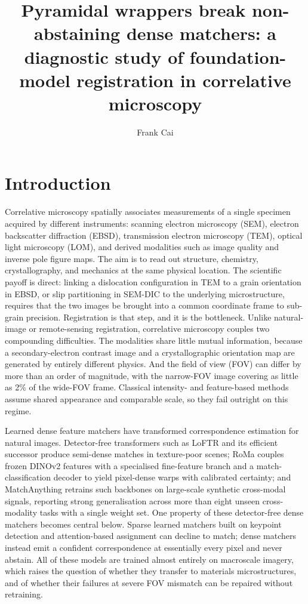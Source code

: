 \documentclass[fleqn,10pt]{wlscirep}
\title{Pyramidal wrappers break non-abstaining dense matchers: a diagnostic study of foundation-model registration in correlative microscopy}
\author[1,*]{Frank Cai}
\affil[1]{Purdue University, West Lafayette, IN, USA; ORCID: 0009-0003-0041-1459}
\affil[*]{frankyc11223@gmail.com}
\begin{document}
\flushbottom
\maketitle
\thispagestyle{empty}

\section*{Introduction}

Correlative microscopy spatially associates measurements of a single specimen acquired by different instruments: scanning electron microscopy (SEM), electron backscatter diffraction (EBSD), transmission electron microscopy (TEM), optical light microscopy (LOM), and derived modalities such as image quality and inverse pole figure maps. The aim is to read out structure, chemistry, crystallography, and mechanics at the same physical location\cite{durmaz2026foundation}. The scientific payoff is direct: linking a dislocation configuration in TEM to a grain orientation in EBSD, or slip partitioning in SEM-DIC to the underlying microstructure, requires that the two images be brought into a common coordinate frame to sub-grain precision. Registration is that step, and it is the bottleneck. Unlike natural-image or remote-sensing registration, correlative microscopy couples two compounding difficulties. The modalities share little mutual information, because a secondary-electron contrast image and a crystallographic orientation map are generated by entirely different physics. And the field of view (FOV) can differ by more than an order of magnitude, with the narrow-FOV image covering as little as 2\% of the wide-FOV frame. Classical intensity- and feature-based methods assume shared appearance and comparable scale, so they fail outright on this regime\cite{durmaz2026amalgamatch}.

Learned dense feature matchers have transformed correspondence estimation for natural images. Detector-free transformers such as LoFTR\cite{sun2021loftr} and its efficient successor\cite{wang2024efficientloftr} produce semi-dense matches in texture-poor scenes; RoMa\cite{edstedt2024roma} couples frozen DINOv2 features\cite{oquab2024dinov2} with a specialised fine-feature branch and a match-classification decoder to yield pixel-dense warps with calibrated certainty; and MatchAnything\cite{he2025matchanything} retrains such backbones on large-scale synthetic cross-modal signals, reporting strong generalisation across more than eight unseen cross-modality tasks with a single weight set. One property of these detector-free dense matchers becomes central below. Sparse learned matchers built on keypoint detection and attention-based assignment\cite{sarlin2020superglue,lindenberger2023lightglue} can decline to match; dense matchers instead emit a confident correspondence at essentially every pixel and never abstain. All of these models are trained almost entirely on macroscale imagery, which raises the question of whether they transfer to materials microstructures, and of whether their failures at severe FOV mismatch can be repaired without retraining.
\end{document}
